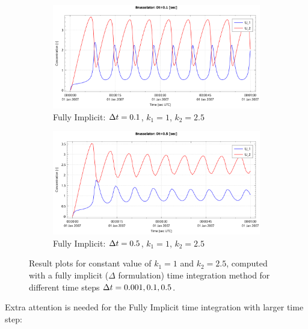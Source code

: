 \begin{figure}[H]
    \begin{subfigure}{0.5\textwidth}
        \includegraphics[width=\textwidth]{figures/brusselator_imp_dt=0d10.pdf}
        \caption{Fully Implicit: $\Delta t=0.1$, $k_1=1$, $k_2=2.5$}
    \end{subfigure}
    \begin{subfigure}{0.5\textwidth}
        \includegraphics[width=\textwidth]{figures/brusselator_imp_dt=0d50.pdf}
        \caption{Fully Implicit: $\Delta t=0.5$, $k_1=1$, $k_2=2.5$}
    \end{subfigure}
    \caption{Result plots for constant value of $k_1 = 1$ and $k_2 =2.5$, computed with a fully implicit ($\Delta$ formulation) time integration method for different time steps $\Delta t = 0.001,  0.1, 0.5$.}
\end{figure}
Extra attention is needed for the Fully Implicit time integration with larger time step:
